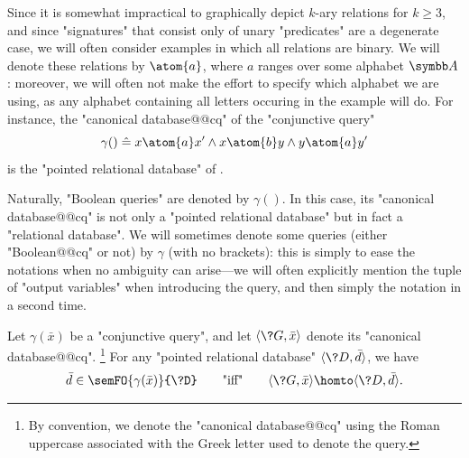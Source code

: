 \begin{marginfigure}
	\centering
	\caption{\AP\label{fig:prelim-db-ex-db}
	The "canonical database@@cq" of $\gamma() \defeq x \atom{a} x' \land x \atom{b} y \land y \atom{a} y'$.}
\end{marginfigure}
Since it is somewhat impractical to graphically depict $k$-ary relations for $k \geq 3$,
and since "signatures" that consist only of unary "predicates" are a degenerate case,
we will often consider examples in which all relations are binary.
We will denote these relations by $\atom{a}$, where $a$ ranges over some alphabet $\A$:
moreover, we will often not make the effort to specify which alphabet we are using,
as any alphabet containing all letters occuring in the example will do.
For instance, the "canonical database@@cq" of the "conjunctive query"
\[
	\gamma() \defeq x \atom{a} x' \land x \atom{b} y \land y \atom{a} y'
\]
is the "pointed relational database" of .

Naturally, "Boolean queries" are denoted by $\gamma()$.
In this case, its "canonical database@@cq" is not only a "pointed relational database" but
in fact a "relational database".
We will sometimes denote some queries (either "Boolean@@cq" or not)
by $\gamma$ (with no brackets): this is simply to ease the notations when
no ambiguity can arise---we will often explicitly mention the tuple of "output variables"
when introducing the query, and then simply the notation in a second time.

\begin{proposition}[""Duality@@CQ""]
	\AP\label{prop:duality@@CQ}
	Let $\gamma(\bar x)$ be a "conjunctive query",
	and let $\tup{\?G, \bar x}$ denote its "canonical database@@cq".%
	\footnote[][-2cm]{By convention, we denote the "canonical database@@cq" using the Roman
	uppercase associated with the Greek letter used to denote
	the query.}
	For any "pointed relational database" $\tup{\?D, \bar d}$,
	we have
	\[
		\bar d \in \semFO{\gamma(\bar x)}{\?D}
		\qquad\text{"iff"}\qquad
		\tup{\?G, \bar x} \homto \tup{\?D, \bar d}.
	\]
\end{proposition}

